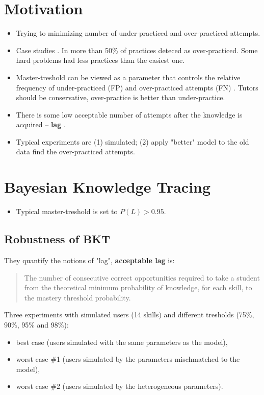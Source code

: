 \documentclass[a4paper]{article}
\begin{document}
\section{Motivation}

\begin{itemize}
	\item	Trying to minimizing number of under-practiced and over-practiced attempts.
	\item	Case studies \cite{cen2007over,yudelson2013estimating}. In
		\cite{cen2007over} more than 50\% of practices deteced as over-practiced.
		Some hard problems had less practices than the easiest one.
	\item	Master-treshold can be viewed as a parameter that controls the relative
		frequency of under-practiced (FP) and over-practiced attempts (FN)
		\cite{fancsali2013optimal}. Tutors should be conservative, over-practice is
		better than under-practice.
	\item	There is some low acceptable number of attempts after the knowledge is
		acquired -- \textbf{lag} \cite{fancsali2013optimal}.
	\item	Typical experiments are (1) simulated; (2) apply "better" model to the
		old data find the over-practiced attempts.
\end{itemize}

\section{Bayesian Knowledge Tracing}

\begin{itemize}
	\item	Typical master-treshold is set to $P(L) > 0.95$.
\end{itemize}

\subsection{Robustness of BKT \cite{fancsali2013optimal}}

They quantify the notions of "lag", \textbf{acceptable lag} is:

\begin{quotation}
The number of consecutive correct opportunities required to take a
student from the theoretical minimum probability of knowledge, for each skill,
to the mastery threshold probability.
\end{quotation}

Three experiments with simulated users (14 skills) and different tresholds (75\%, 90\%, 95\% and 98\%):
\begin{itemize}
	\item	best case (users simulated with the same parameters as the model),
	\item	worst case \#1 (users simulated by the parameters mischmatched to the model),
	\item	worst case \#2 (users simulated by the heterogeneous parameters).
\end{itemize}
\end{document}
